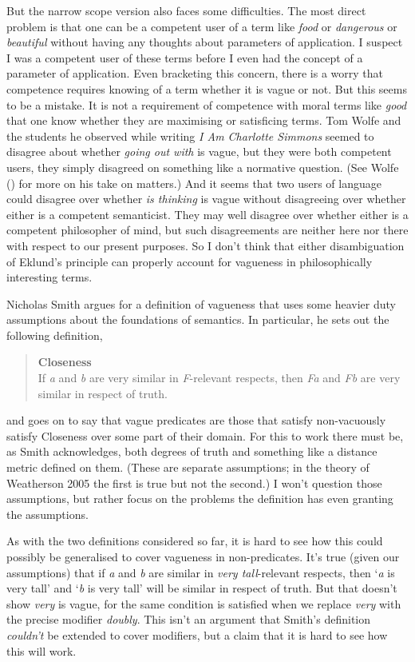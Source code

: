 \documentclass[
  10pt,
  letterpaper,
  DIV=11,
  numbers=noendperiod,
  twoside]{scrartcl}
\begin{document}
But the narrow scope version also faces some difficulties. The most
direct problem is that one can be a competent user of a term like
\emph{food} or \emph{dangerous} or \emph{beautiful} without having any
thoughts about parameters of application. I suspect I was a competent
user of these terms before I even had the concept of a parameter of
application. Even bracketing this concern, there is a worry that
competence requires knowing of a term whether it is vague or not. But
this seems to be a mistake. It is not a requirement of competence with
moral terms like \emph{good} that one know whether they are maximising
or satisficing terms. Tom Wolfe and the students he observed while
writing \emph{I Am Charlotte Simmons} seemed to disagree about whether
\emph{going out with} is vague, but they were both competent users, they
simply disagreed on something like a normative question. (See Wolfe
() for more on his take on matters.) And
it seems that two users of language could disagree over whether \emph{is
thinking} is vague without disagreeing over whether either is a
competent semanticist. They may well disagree over whether either is a
competent philosopher of mind, but such disagreements are neither here
nor there with respect to our present purposes. So I don't think that
either disambiguation of Eklund's principle can properly account for
vagueness in philosophically interesting terms.

Nicholas Smith argues for a definition of vagueness that uses some
heavier duty assumptions about the foundations of semantics. In
particular, he sets out the following definition,

\begin{quote}
\textbf{Closeness}\\
If \emph{a} and \emph{b} are very similar in \emph{F}-relevant respects,
then \emph{Fa} and \emph{Fb} are very similar in respect of truth.
\end{quote}

and goes on to say that vague predicates are those that satisfy
non-vacuously satisfy Closeness over some part of their domain. For this
to work there must be, as Smith acknowledges, both degrees of truth and
something like a distance metric defined on them. (These are separate
assumptions; in the theory of Weatherson 2005 the first is true but not
the second.) I won't question those assumptions, but rather focus on the
problems the definition has even granting the assumptions.

As with the two definitions considered so far, it is hard to see how
this could possibly be generalised to cover vagueness in non-predicates.
It's true (given our assumptions) that if \emph{a} and \emph{b} are
similar in \emph{very tall}-relevant respects, then `\emph{a} is very
tall' and `\emph{b} is very tall' will be similar in respect of truth.
But that doesn't show \emph{very} is vague, for the same condition is
satisfied when we replace \emph{very} with the precise modifier
\emph{doubly}. This isn't an argument that Smith's definition
\emph{couldn't} be extended to cover modifiers, but a claim that it is
hard to see how this will work.
\end{document}
